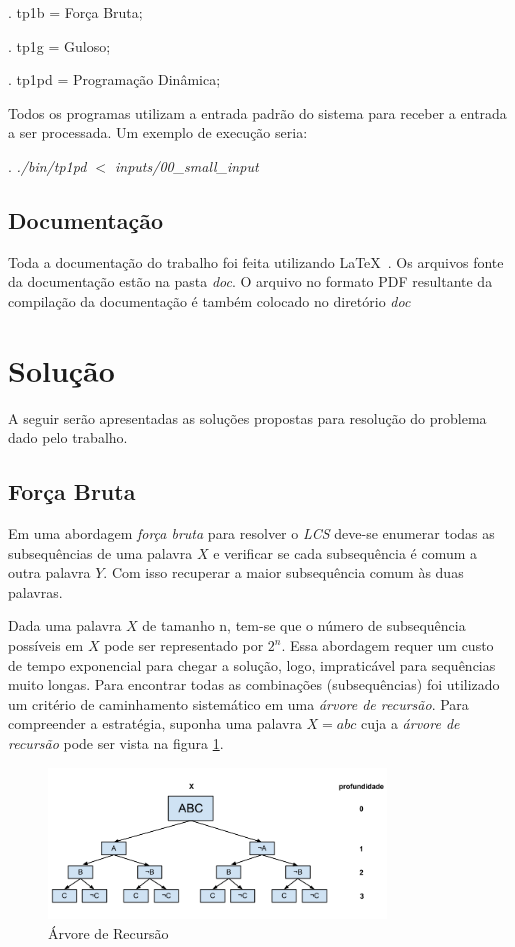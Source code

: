 . tp1b = Força Bruta;

. tp1g = Guloso;

. tp1pd = Programação Dinâmica;

Todos os programas utilizam a entrada padrão do sistema para receber
a entrada a ser processada. Um exemplo de execução seria: 

. \emph{./bin/tp1pd $<$ inputs/00\_small\_input}

\subsection{Documentação}
Toda a documentação do trabalho foi feita utilizando \LaTeX\ . Os arquivos 
fonte da documentação estão na pasta {\it doc}. O arquivo no formato 
PDF resultante da compilação da documentação é também colocado no 
diretório {\it doc}

\section{Solução}

A seguir serão apresentadas as soluções propostas para resolução do 
problema dado pelo trabalho.

\subsection{Força Bruta}

Em uma abordagem \emph{força bruta} para resolver o \emph{LCS} deve-se
enumerar todas as subsequências de uma palavra $X$ e verificar se cada
subsequência é comum a outra palavra $Y$. Com isso recuperar a maior 
subsequência comum às duas palavras. 

Dada uma palavra $X$ de tamanho n, tem-se que o número de
subsequência possíveis em $X$ pode ser representado por $2^n$. Essa 
abordagem requer um custo de tempo exponencial para chegar a solução, 
logo, impraticável para sequências muito longas. Para encontrar todas
as combinações (subsequências) foi utilizado um critério de caminhamento
sistemático em uma \emph{árvore de recursão}. Para compreender a 
estratégia, suponha uma palavra $X = abc$ cuja a \emph{árvore de 
recursão} pode ser vista na figura \ref{fig:recursiontree}.

\begin{figure}[H]
    \begin{center}
        \includegraphics[width=0.8\textwidth,natwidth=610,natheight=642]{doc/recursion-tree.png}
        \caption{Árvore de Recursão}
        \label{fig:recursiontree}
    \end{center}
\end{figure}

